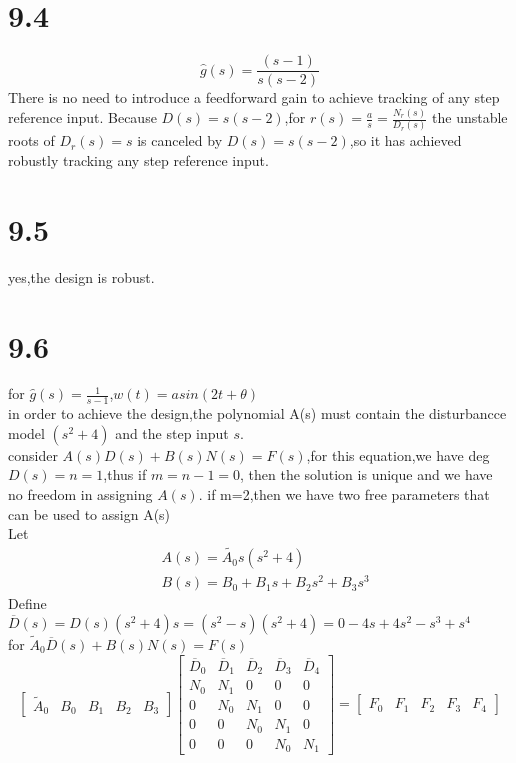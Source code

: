 \documentclass{article}
\begin{document}
\section*{9.4}
\[ 
\hat{g}(s)=\frac{(s-1)}{s(s-2)}    
\]
There is no need to introduce a feedforward gain to achieve tracking of any step reference input.
Because $D(s)=s(s-2)$,for $r(s)=\frac{a}{s}=\frac{N_r(s)}{D_r(s)}$
the unstable roots of $D_r(s)=s$ is canceled by $D(s)=s(s-2)$,so it has achieved robustly tracking any step reference input.

\section*{9.5}
yes,the design is robust.

\section*{9.6}
for $\hat{g}(s)=\frac{1}{s-1}$,$w(t)=asin(2t+\theta)$\\
in order to achieve the design,the polynomial A(s) must contain the disturbancce model $(s^2+4)$ and the step input $s$.\\
consider $A(s)D(s)+B(s)N(s)=F(s)$,for this equation,we have deg $D(s)=n=1$,thus if $m=n-1=0$, then the solution is unique and we have no freedom in assigning $A(s)$.
if m=2,then we have two free parameters that can be used to assign A(s)\\
Let 
\[     
\begin{split}
&A(s)=\tilde{A_0}s(s^2+4)\\
&B(s)=B_0+B_1s+B_2s^2+B_3s^3
\end{split}
\]
Define $\overline{D}(s)=D(s)(s^2+4)s=(s^2-s)(s^2+4)=0-4s+4s^2-s^3+s^4$\\
for $\tilde{A}_0\overline{D}(s)+B(s)N(s)=F(s)$
\[ 
    \left[ 
        \begin{array}{ccccc}
            \tilde{A}_0 & B_0 & B_1 & B_2 & B_3
        \end{array}
    \right]
    \left[ 
        \begin{array}{ccccc}
            \overline{D}_0 & \overline{D}_1 & \overline{D}_2 & \overline{D}_3 &\overline{D}_4\\
            N_0 & N_1 & 0 & 0 & 0\\
            0 & N_0 & N_1 & 0 & 0\\
            0 & 0 & N_0 & N_1 &0\\
            0 & 0 & 0 & N_0 & N_1
        \end{array}
    \right]=\left[ 
        \begin{array}{ccccc}
            F_0 & F_1 & F_2 & F_3 & F_4
        \end{array}
    \right]    
    \] 
\end{document}
